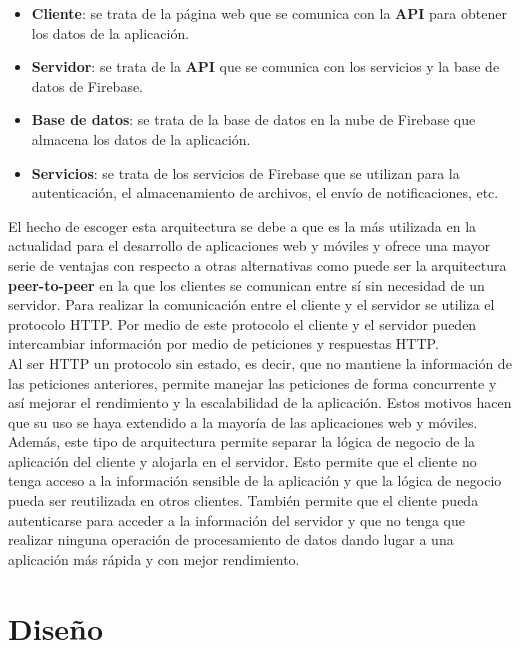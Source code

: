 \newpage

\begin{itemize}
    \item \textbf{Cliente}: se trata de la página web que se comunica con la \textbf{API} para obtener los datos de la aplicación.
    \item \textbf{Servidor}: se trata de la \textbf{API} que se comunica con los servicios y la base de datos de Firebase.
    \item \textbf{Base de datos}: se trata de la base de datos en la nube de Firebase que almacena los datos de la aplicación.
    \item \textbf{Servicios}: se trata de los servicios de Firebase que se utilizan para la autenticación, el almacenamiento
    de archivos, el envío de notificaciones, etc.
\end{itemize}

El hecho de escoger esta arquitectura se debe a que es la más utilizada en la actualidad para el desarrollo de aplicaciones
web y móviles y ofrece una mayor serie de ventajas con respecto a otras alternativas como puede ser la arquitectura \textbf{peer-to-peer}
en la que los clientes se comunican entre sí sin necesidad de un servidor. Para realizar la comunicación entre el cliente
y el servidor se utiliza el protocolo HTTP. Por medio de este protocolo el cliente y el servidor pueden
intercambiar información por medio de peticiones y respuestas HTTP. \\

Al ser HTTP un protocolo sin estado, es decir, que no mantiene la información de las peticiones anteriores, permite
manejar las peticiones de forma concurrente y así mejorar el rendimiento y la escalabilidad de la aplicación. Estos
motivos hacen que su uso se haya extendido a la mayoría de las aplicaciones web y móviles. \\

Además, este tipo de arquitectura permite separar la lógica de negocio de la aplicación del cliente y alojarla en el
servidor. Esto permite que el cliente no tenga acceso a la información sensible de la aplicación y que la lógica de
negocio pueda ser reutilizada en otros clientes. También permite que el cliente pueda autenticarse para acceder a la
información del servidor y que no tenga que realizar ninguna operación de procesamiento de datos dando lugar a una
aplicación más rápida y con mejor rendimiento.

\newpage

\section{Diseño}\label{sec:diseno}

